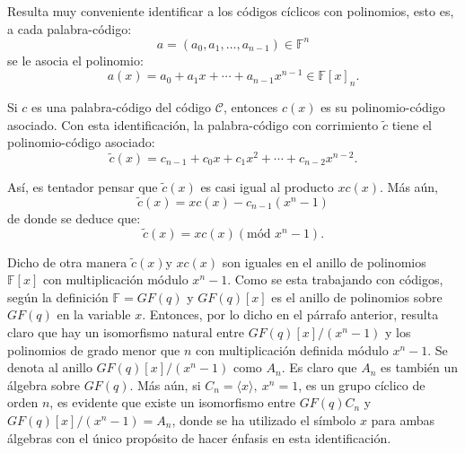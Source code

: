 Resulta muy conveniente identificar a los códigos cíclicos con polinomios, esto es, a cada palabra-código:
\[ a = (a_0, a_1, \dots , a_{n-1}) \in \mathds{F}^n \] se le asocia el polinomio: \[ a(x) = a_0 + a_1x+ \cdots + a_{n-1}x^{n-1} \in \mathds{F}[x]_n .\] 

Si $c$ es una palabra-código del código $\mathcal{C}$, entonces $c(x)$ es su polinomio-código asociado. Con esta identificación, la palabra-código con corrimiento $\tilde{c}$ tiene el polinomio-código asociado: \[ \tilde{c}(x) = c_{n-1} + c_0x + c_1x^2 + \cdots + c_{n-2}x^{n-2}. \] 

Así, es tentador pensar que $\tilde{c}(x) $ es casi igual al producto $xc(x)$. Más aún, 
\[ \tilde{c}(x) = xc(x) - c_{n-1}(x^n -1)  \] de donde se deduce que: \[ \tilde{c}(x) = xc(x) (\mbox{mód } x^n-1) .\] 

Dicho de otra manera $\tilde{c}(x)$y $xc(x)$ son iguales en el anillo de polinomios $\mathds{F}[x]$ con multiplicación módulo $x^n-1$. Como se esta trabajando con códigos, según la definición $\mathds{F} = GF(q) $ y $GF(q)[x]$ es el anillo de polinomios sobre $GF(q)$ en la variable $x$. Entonces, por lo dicho en el párrafo anterior, resulta claro que hay un isomorfismo natural entre $GF(q)[x]/(x^n-1)$ y los polinomios de grado menor que $n$ con multiplicación definida módulo $x^n-1$. Se denota al anillo $GF(q)[x]/(x^n-1)$ como $A_n$. Es claro que $A_n$ es también un álgebra sobre $GF(q)$. Más aún, si $C_n = \langle x \rangle,\ x^n =1$, es un grupo cíclico de orden $n$, es evidente que existe un isomorfismo entre $GF(q)C_n$ y $GF(q)[x]/(x^n-1) = A_n$, donde se ha utilizado el símbolo $x$ para ambas álgebras con el único propósito de hacer énfasis en esta identificación.


